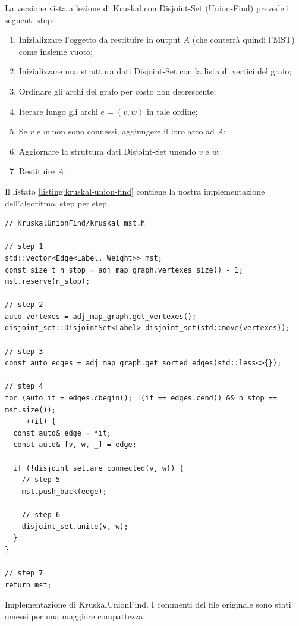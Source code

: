La versione vista a lezione di Kruskal con Disjoint-Set (Union-Find) prevede i seguenti step:

\begin{enumerate}
    \item Inizializzare l'oggetto da restituire in output $A$ (che conterrà quindi l'MST) come insieme vuoto;
    \item Inizializzare una struttura dati Disjoint-Set con la lista di vertici del grafo;
    \item Ordinare gli archi del grafo per costo non decrescente;
    \item Iterare lungo gli archi $e = (v, w)$ in tale ordine;
    \item Se $v$ e $w$ non sono connessi, aggiungere il loro arco ad $A$;
    \item Aggiornare la struttura dati Disjoint-Set unendo $v$ e $w$;
    \item Restituire $A$.
\end{enumerate}

\noindent Il listato \ref{listing:kruskal-union-find} contiene la nostra implementazione dell'algoritmo, step per step.

\begin{listing}
\begin{verbatim}
// KruskalUnionFind/kruskal_mst.h

// step 1
std::vector<Edge<Label, Weight>> mst;
const size_t n_stop = adj_map_graph.vertexes_size() - 1;
mst.reserve(n_stop);

// step 2
auto vertexes = adj_map_graph.get_vertexes();
disjoint_set::DisjointSet<Label> disjoint_set(std::move(vertexes));

// step 3
const auto edges = adj_map_graph.get_sorted_edges(std::less<>{});

// step 4
for (auto it = edges.cbegin(); !(it == edges.cend() && n_stop == mst.size());
     ++it) {
  const auto& edge = *it;
  const auto& [v, w, _] = edge;

  if (!disjoint_set.are_connected(v, w)) {
    // step 5
    mst.push_back(edge);

    // step 6
    disjoint_set.unite(v, w);
  }
}

// step 7
return mst;
\end{verbatim}
\caption{Implementazione di KruskalUnionFind. I commenti del file originale sono stati omessi per una maggiore compattezza.}
\label{listing:kruskal-union-find}
\end{listing}

